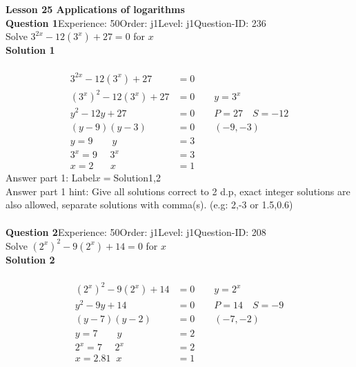 \documentclass{article}
\begin{document}
\noindent\huge{\textbf{Lesson 25 Applications of logarithms}}\\[12pt]
\noindent\textbf{Question 1}\hspace{20pt}Experience: 50\hspace{20pt}Order: j1\hspace{20pt}Level: j1\hspace{20pt}Question-ID: 236\\[2pt]
Solve $3^{2x}-12(3^x)+27=0$ for $x$\\[4pt]
\noindent\textbf{Solution 1}\\[2pt]
\\[-35pt]\begin{align*}
3^{2x}-12(3^x)+27&=0\\[2pt]
(3^x)^2-12(3^x)+27&=0\qquad y=3^x\\[2pt]
y^2-12y+27&=0\qquad P=27 \quad S=-12\\[2pt]
(y-9)(y-3)&=0\qquad (-9,-3)\\[2pt]
y=9 \qquad y&=3\\[2pt]
3^x=9\hspace{16pt} 3^x&=3\\[2pt]
x=2 \hspace{21pt} x&=1
\end{align*}
Answer part 1: \hspace{10pt}Label\hspace{10pt}$x=$\hspace{10pt}Solution\hspace{10pt}1,2\\
Answer part 1 hint: \hspace{15pt}Give all solutions correct to 2 d.p, exact integer solutions are also allowed, separate solutions with comma(s).  (e.g:  2,-3 or 1.5,0.6)  \\
\\[4pt]
\noindent\textbf{Question 2}\hspace{20pt}Experience: 50\hspace{20pt}Order: j1\hspace{20pt}Level: j1\hspace{20pt}Question-ID: 208\\[2pt]
Solve $(2^x)^2-9(2^x)+14=0$ for $x$\\[4pt]
\noindent\textbf{Solution 2}\\[2pt]
\\[-35pt]\begin{align*}
(2^x)^2-9(2^x)+14&=0\qquad y=2^x\\[2pt]
y^2-9y+14&=0\qquad P=14 \quad S=-9\\[2pt]
(y-7)(y-2)&=0\qquad (-7,-2)\\[2pt]
y=7 \qquad y&=2\\[2pt]
2^x=7\hspace{16pt} 2^x&=2\\[2pt]
x=2.81 \hspace{7pt} x&=1
\end{align*}
\end{document}
